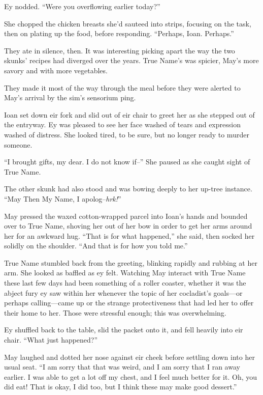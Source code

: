 Ey nodded. ``Were you overflowing earlier today?''

She chopped the chicken breasts she'd sauteed into strips, focusing on the task, then on plating up the food, before responding. ``Perhaps, Ioan. Perhaps.''

They ate in silence, then. It was interesting picking apart the way the two skunks' recipes had diverged over the years. True Name's was spicier, May's more savory and with more vegetables.

They made it most of the way through the meal before they were alerted to May's arrival by the sim's sensorium ping.

Ioan set down eir fork and slid out of eir chair to greet her as she stepped out of the entryway. Ey was pleased to see her face washed of tears and expression washed of distress. She looked tired, to be sure, but no longer ready to murder someone.

``I brought gifts, my dear. I do not know if--'' She paused as she caught sight of True Name.

The other skunk had also stood and was bowing deeply to her up-tree instance. ``May Then My Name, I apolog--\emph{hrk!}''

May pressed the waxed cotton-wrapped parcel into Ioan's hands and bounded over to True Name, shoving her out of her bow in order to get her arms around her for an awkward hug. ``That is for what happened,'' she said, then socked her solidly on the shoulder. ``And that is for how you told me.''

True Name stumbled back from the greeting, blinking rapidly and rubbing at her arm. She looked as baffled as ey felt. Watching May interact with True Name these last few days had been something of a roller coaster, whether it was the abject fury ey saw within her whenever the topic of her cocladist's goals—or perhaps calling—came up or the strange protectiveness that had led her to offer their home to her. Those were stressful enough; this was overwhelming.

Ey shuffled back to the table, slid the packet onto it, and fell heavily into eir chair. ``What just happened?''

May laughed and dotted her nose against eir cheek before settling down into her usual seat. ``I am sorry that that was weird, and I am sorry that I ran away earlier. I was able to get a lot off my chest, and I feel much better for it. Oh, you did eat! That is okay, I did too, but I think these may make good dessert.''

